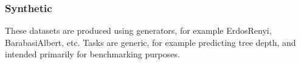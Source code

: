\documentclass[letterpaper,10pt,english]{sphinxhowto}
\begin{document}
\begin{fulllineitems}

\begin{fulllineitems}
\label{\detokenize{datasets/real:datasets.real.RoadDataset.raw_file_names}}
\pysigstartsignatures
{}
\pysigstopsignatures
\end{fulllineitems}


\end{fulllineitems}


\sphinxstepscope


\subsubsection{Synthetic}
\label{\detokenize{datasets/synthetic:synthetic}}\label{\detokenize{datasets/synthetic::doc}}
\sphinxAtStartPar
These datasets are produced using generators, for example Erdos\sphinxhyphen{}Renyi, Barabasi\sphinxhyphen{}Albert, etc.
Tasks are generic, for example predicting tree depth, and intended primarily for benchmarking purposes.
\label{\detokenize{datasets/synthetic:module-datasets.synthetic}}
\end{document}
